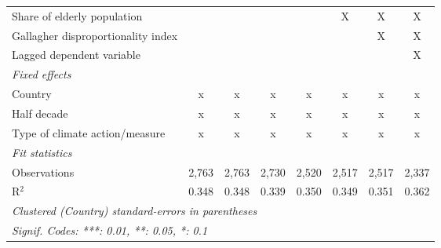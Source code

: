 \begin{tabular}{lccccccc}
   Share of elderly population                                   &                &                &                &               & X             & X             & X\\  
   Gallagher disproportionality index                            &                &                &                &               &               & X             & X\\  
   Lagged dependent variable                                     &                &                &                &               &               &               & X\\  
   \emph{Fixed effects}\\
   Country                                                       & x              & x              & x              & x             & x             & x             & x\\  
   Half decade                                                   & x              & x              & x              & x             & x             & x             & x\\  
   Type of climate action/measure                                & x              & x              & x              & x             & x             & x             & x\\  
   \midrule \emph{Fit statistics}\\
   Observations                                                  & 2,763          & 2,763          & 2,730          & 2,520         & 2,517         & 2,517         & 2,337\\  
   R$^2$                                                         & 0.348          & 0.348          & 0.339          & 0.350         & 0.349         & 0.351         & 0.362\\  
   \midrule
   \multicolumn{8}{l}{\emph{Clustered (Country) standard-errors in parentheses}}\\
   \multicolumn{8}{l}{\emph{Signif. Codes: ***: 0.01, **: 0.05, *: 0.1}}\\
\end{tabular}
\par\endgroup


